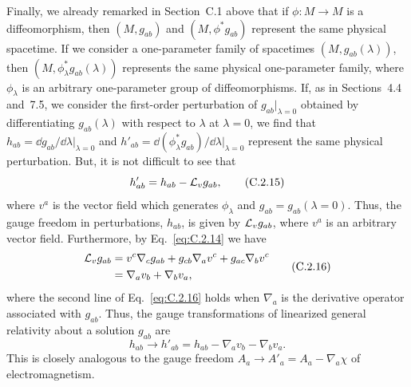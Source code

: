 Finally, we already remarked in Section~C.1 above that if \(\phi:M\to M\) is a
diffeomorphism, then \((M,g_{ab})\) and \((M,\phi^*g_{ab})\) represent the same
physical spacetime. If we consider a one-parameter family of spacetimes
\((M,g_{ab}(\lambda))\), then \((M,\phi_\lambda^*g_{ab}(\lambda))\) represents the
same physical one-parameter family, where \(\phi_\lambda\) is an arbitrary
one-parameter group of diffeomorphisms. If, as in Sections~4.4 and~7.5, we consider
the first-order perturbation of \(g_{ab}\big\rvert_{\lambda=0}\) obtained by
differentiating \(g_{ab}(\lambda)\) with respect to \(\lambda\) at \(\lambda=0\), we
find that
\(h_{ab}=\dd g_{ab}/\dd\lambda\big\rvert_{\lambda=0}\) and
\(h'_{ab}=\dd(\phi_\lambda^*g_{ab})/\dd\lambda\big\rvert_{\lambda=0}\) represent the
same physical perturbation. But, it is not difficult to see that
\begin{equation}
  h'_{ab}=h_{ab}-\mathcal{L}_vg_{ab},
  \tag{C.2.15}\label{eq:C.2.15}
\end{equation}
where \(v^a\) is the vector field which generates \(\phi_\lambda\) and
\(g_{ab}=g_{ab}(\lambda=0)\). Thus, the gauge freedom in perturbations, \(h_{ab}\),
is given by \(\mathcal{L}_vg_{ab}\), where \(v^a\) is an arbitrary vector field.
Furthermore, by Eq.~\eqref{eq:C.2.14} we have
\begin{equation}
\begin{aligned}
  \mathcal{L}_vg_{ab}
  &=v^c\nabla_cg_{ab}+g_{cb}\nabla_av^c+g_{ac}\nabla_bv^c\\
  &=\nabla_av_b+\nabla_bv_a,
\end{aligned}
  \tag{C.2.16}\label{eq:C.2.16}
\end{equation}
where the second line of Eq.~\eqref{eq:C.2.16} holds when \(\nabla_a\) is the
derivative operator associated with \(g_{ab}\). Thus, the gauge transformations of
linearized general relativity about a solution \(g_{ab}\) are
\begin{equation}
  h_{ab}\longrightarrow h'_{ab}
  =h_{ab}-\nabla_av_b-\nabla_bv_a.
  \tag{C.2.17}\label{eq:C.2.17}
\end{equation}
This is closely analogous to the gauge freedom
\(A_a\longrightarrow A'_a=A_a-\nabla_a\chi\) of electromagnetism.
